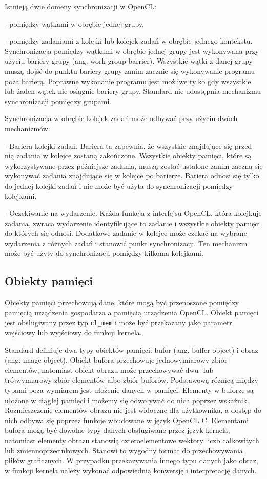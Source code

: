 Istnieją dwie domeny synchronizacji w OpenCL:

- pomiędzy wątkami w obrębie jednej grupy,

- pomiędzy zadaniami z kolejki lub kolejek zadań w obrębie jednego kontekstu.\\

Synchronizacja pomiędzy wątkami w obrębie jednej grupy jest wykonywana przy użyciu bariery grupy (ang. work-group barrier). Wszystkie wątki z danej grupy muszą dojść do punktu bariery grupy zanim zacznie się wykonywanie programu poza barierą. Poprawne wykonanie programu jest możliwe tylko gdy wszystkie lub żaden wątek nie osiągnie bariery grupy. Standard nie udostępnia mechanizmu synchronizacji pomiędzy grupami.

Synchronizacja w obrębie kolejek zadań może odbywać przy użyciu dwóch mechanizmów:

- Bariera kolejki zadań. Bariera ta zapewnia, że wszystkie znajdujące się przed nią zadania w kolejce zostaną zakończone. Wszystkie obiekty pamięci, które są wykorzystywane przez późniejsze zadania, muszą zostać ustalone zanim zaczną się wykonywać zadania znajdujące się w kolejce po barierze. Bariera odnosi się tylko do jednej kolejki zadań i nie może być użyta do synchronizacji pomiędzy kolejkami. 

- Oczekiwanie na wydarzenie. Każda funkcja z interfejsu OpenCL, która kolejkuje zadania, zwraca wydarzenie identyfikujące to zadanie i wszystkie obiekty pamięci do których się odnosi. Dodatkowe zadanie w kolejce może czekać na wybrane wydarzenia z różnych zadań i stanowić punkt synchronizacji. Ten mechanizm może być użyty do synchronizacji pomiędzy kilkoma kolejkami.

\subsection{Obiekty pamięci}\label{sec:OpenC61asdL}

Obiekty pamięci przechowują dane, które mogą być przenoszone pomiędzy pamięcią urządzenia gospodarza a pamięcią urządzenia OpenCL. Obiekt pamięci jest obsługiwany przez typ \verb|cl_mem| i może być przekazany jako parametr wejściowy lub wyjściowy do funkcji kernela.

Standard definiuje dwa typy obiektów pamięci: bufor (ang. buffer object) i obraz (ang. image object). Obiekt bufora przechowuje jednowymiarowy zbiór elementów, natomiast obiekt obrazu może przechowywać dwu- lub trójwymiarowy zbiór elementów albo zbiór buforów. Podstawową różnicą między typami poza wymiarem jest ułożenie danych w pamięci. Elementy w buforze są ułożone w ciągłej pamięci i możemy się odwoływać do nich poprzez wskaźnik. Rozmieszczenie elementów obrazu nie jest widoczne dla użytkownika, a dostęp do nich odbywa się poprzez funkcje wbudowane w język OpenCL C. Elementami bufora mogą być dowolne typy danych obsługiwane przez język kernela, natomiast elementy obrazu stanowią czteroelementowe wektory liczb całkowitych lub zmiennoprzecinkowych. Stanowi to wygodny format do przechowywania plików graficznych. W przypadku przekazywania innego typu danych jako obraz, w funkcji kernela należy wykonać odpowiednią konwersję i interpretację danych.

